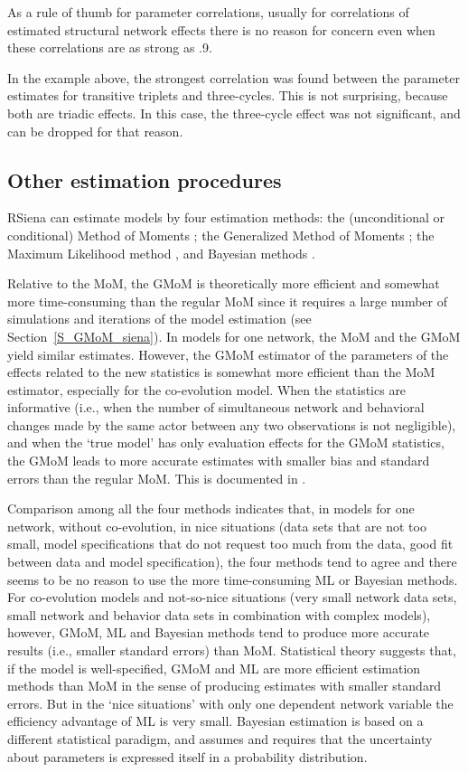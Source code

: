 \documentclass[a4paper,fleqn,11pt]{article}
\newcommand{\+}{\, + \,}
\newcommand{\RS}{{\sf \textsf{RSiena} }}
\begin{document}
As a rule of thumb for parameter correlations,
usually for correlations of estimated structural network effects there is no
reason for concern even when these correlations
are as strong as .9.

In the example above, the strongest correlation was found between
the parameter estimates for transitive triplets and three-cycles.
This is not surprising, because both are triadic effects.
In this case, the three-cycle effect was not significant,
and can be dropped for that reason.

\subsection{Other estimation procedures}

\RS can estimate models by four estimation methods:
the (unconditional or conditional)
Method of Moments \citep*[`MoM', the default; ][]{Snijders01, SnijdersEA07};
the Generalized Method of Moments \citep*[`GMoM', see][]{ASS2015,ASS2019};
the Maximum Likelihood method \citep*[`ML', see][]{SnijdersEA10a},
and Bayesian methods
\citep[see][]{Koskinen04,KoskinenSnijders07,SchweinbergerSnijders07c,KoskinenSnijders2023}.


Relative to the MoM, the GMoM is theoretically more efficient and somewhat more time-consuming
than the regular MoM since it requires a large number of simulations and
iterations of the model estimation (see Section~\ref{S_GMoM_siena}).
In models for one network, the MoM and the GMoM yield similar estimates.
However, the GMoM estimator of the parameters of the effects related to the new statistics
is somewhat more efficient than the MoM estimator, especially for the co-evolution model.
When the statistics are informative (i.e., when the number of simultaneous network
and behavioral changes made by the same actor between any two observations is not negligible),
and when the `true model' has only evaluation effects for the GMoM statistics,
the GMoM leads to more accurate estimates with smaller bias
and standard errors than the regular MoM.
This is documented in \citet{ASS2015,ASS2019}.

Comparison among all the four methods indicates that,
in models for one network, without co-evolution,
in nice situations (data sets that are not too small, model specifications
that do not request too much from the data, good fit between data and
model specification), the four methods tend to agree
and there seems to be no reason to use the more time-consuming
ML or Bayesian methods.
For co-evolution models and not-so-nice situations (very small network data sets,
small network and behavior data sets in combination with complex models),
however, GMoM, ML and Bayesian methods tend to produce more accurate results
(i.e., smaller standard errors) than MoM.
Statistical theory suggests that, if the model is well-specified,
GMoM and ML are more efficient estimation methods
than MoM in the sense of producing estimates with smaller standard errors.
But in the `nice situations'
with only one dependent network variable the efficiency advantage of ML is very small.
Bayesian estimation is based on a different statistical paradigm, and
assumes and requires that the uncertainty about parameters is expressed
itself in a probability distribution.
\end{document}
